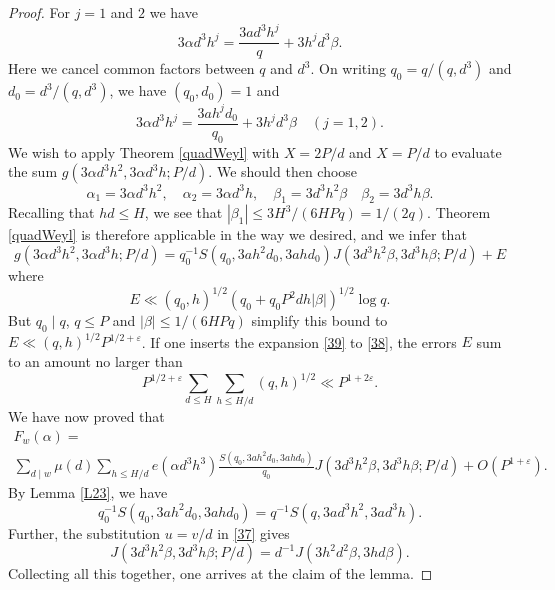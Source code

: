 \documentclass[10pt,a4paper]{amsart}
\newcommand{\f}[2]{\frac{#1}{#2}}
\begin{document}
\begin{proof}
For $j=1$ and $2$ we have
$$ 3\alpha d^3 h^j = \frac{3ad^3h^j}{q} + 3h^jd^3\beta. $$
Here we cancel  common factors between $q$ and $d^3$. On writing $q_0=q/(q,d^3)$ and $d_0=d^3/(q,d^3)$, we have $(q_0,d_0)=1$ and
$$    3\alpha d^3 h^j = \frac{3ah^jd_0}{q_0} + 3h^jd^3\beta \quad (j=1,2). $$
We wish to apply Theorem \ref{quadWeyl} with $X=2P/d$ and $X=P/d$ to evaluate the sum $g(3\alpha d^3h^2, 3\alpha d^3h; P/d)$. We should then choose 
$$\alpha_1= 
3\alpha d^3 h^2, \quad \alpha_2 =3\alpha d^3 h, \quad \beta_1=3 d^3 h^2 \beta\quad \beta_2 = 3 d^3 h\beta. $$
Recalling that $hd\le H$, we see that $|\beta_1|\le 3H^3/(6HPq)=1/(2q)$. Theorem \ref{quadWeyl} is therefore applicable in the way we desired, and we infer that
\begin{equation}\label{39} 
  g(3\alpha d^3h^2, 3\alpha d^3h; P/d) = q_0^{-1} S(q_0, 3ah^2d_0, 3ahd_0) J(3 d^3 h^2 \beta,3 d^3 h\beta;P/d) + E \end{equation}
where
$$ E \ll (q_0,h)^{1/2} (q_0 +q_0 P^2dh |\beta|)^{1/2} \log q. $$
But $q_0\mid q$,  $q \le P$ and $|\beta|\le 1/(6HPq)$ simplify this bound to
$ E\ll (q,h)^{1/2} P^{1/2+\varepsilon}$. If one inserts the expansion \eqref{39} to \eqref{38}, the errors $E$ sum to an amount no larger than
$$ P^{1/2+\varepsilon} \sum_{d\le H} \sum _{h\le H/d} (q,h)^{1/2} \ll P^{1+2\varepsilon}. $$
We have now proved that
\begin{multline*}F_w(\alpha) = \\
\sum_{d\mid w}\mu(d) \sum_{h\le H/d} e(\alpha d^3 h^3) \f{S(q_0, 3ah^2d_0, 3ahd_0)}{q_0}J(3 d^3 h^2 \beta,3 d^3 h\beta;P/d) +O(P^{1+\varepsilon}).\end{multline*}
By Lemma \ref{L23}, we have 
$$ q_0^{-1} S(q_0, 3ah^2d_0, 3ahd_0)= q^{-1} S(q,3ad^3h^2, 3ad^3h). $$
Further, the substitution $u=v/d$ in \eqref{37} gives 
$$ J(3 d^3 h^2 \beta,3 d^3 h\beta;P/d) = d^{-1} J(3h^2d^2\beta, 3hd\beta). $$
Collecting all this together, one arrives at the claim of the lemma.
\end{proof} 
\end{document}
